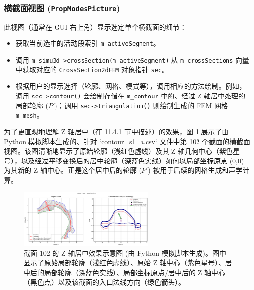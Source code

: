 \documentclass{ctexart}
\begin{document}
\subsubsection{横截面视图 (\texttt{PropModesPicture})}
此视图（通常在 GUI 右上角）显示选定单个横截面的细节：
\begin{itemize}
    \item 获取当前选中的活动段索引 \texttt{m\_activeSegment}。
    \item 调用 \texttt{m\_simu3d->crossSection(m\_activeSegment)} 从 \texttt{m\_crossSections} 向量中获取对应的 \texttt{CrossSection2dFEM} 对象指针 \texttt{sec}。
    \item 根据用户的显示选择（轮廓、网格、模式等），调用相应的方法绘制。例如，调用 \texttt{sec->contour()} 会绘制存储在 \texttt{m\_contour} 中的、经过 Z 轴居中处理的局部轮廓 (\(P'\))；调用 \texttt{sec->triangulation()} 则绘制生成的 FEM 网格 \texttt{m\_mesh}。
\end{itemize}

为了更直观地理解 Z 轴居中（在 11.4.1 节中描述）的效果，图 \ref{fig:cross_section_centering} 展示了由 Python 模拟脚本生成的、针对 `contour\_s1\_a.csv` 文件中第 102 个截面的横截面视图。该图清晰地显示了原始轮廓（浅红色虚线）及其 Z 轴几何中心（紫色星号），以及经过平移变换后的居中轮廓（深蓝色实线）如何以局部坐标原点 (0,0) 为其新的 Z 轴中心。正是这个居中后的轮廓 (\(P'\)) 被用于后续的网格生成和声学计算。

\begin{figure}[htbp]
  \centering
  \includegraphics[width=0.6\textwidth]{contour_s1_a_plot_seg106.png}
  \caption{截面 102 的 Z 轴居中效果示意图 (由 Python 模拟脚本生成)。图中显示了原始局部轮廓（浅红色虚线）、原始 Z 轴中心（紫色星号）、居中后的局部轮廓（深蓝色实线）、局部坐标原点/居中后的 Z 轴中心（黑色点）以及该截面的入口法线方向（绿色箭头）。}
  \label{fig:cross_section_centering}
\end{figure}
\end{document}
